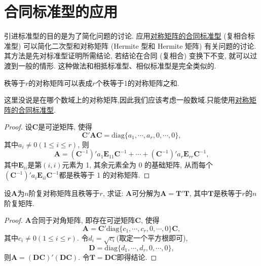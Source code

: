 \documentclass[../../main.tex]{subfiles}%
\begin{document}
\section{合同标准型的应用}

引进标准型的目的是为了简化问题的讨论. 应用\hyperref[theorem:对称矩阵的合同标准型]{对称矩阵的合同标准型} (复相合标准型) 可以简化二次型和对称矩阵 (Hermite 型和 Hermite 矩阵) 有关问题的讨论. 其方法是先对标准型证明所需结论, 若结论在合同 (复相合) 变换下不变, 就可以过渡到一般的情形. 这种做法和相抵标准型、相似标准型是完全类似的.

\begin{proposition}[对称矩阵的秩1分解]\label{proposition:对称矩阵的秩1分解}
秩等于$r$的对称矩阵可以表成$r$个秩等于1的对称矩阵之和.
\end{proposition}
\begin{remark}
这里没说是在哪个数域上的对称矩阵,因此我们应该考虑一般数域.只能使用\hyperref[theorem:对称矩阵的合同标准型]{对称矩阵的合同标准型}.
\end{remark}
\begin{proof}
设$\boldsymbol{C}$是可逆矩阵, 使得
\[
\boldsymbol{C}'\boldsymbol{A}\boldsymbol{C}=\text{diag}\{a_1, \cdots, a_r, 0, \cdots, 0\},
\]
其中$a_i\neq 0 (1\leqslant  i\leqslant  r)$, 则
\[
\boldsymbol{A}=(\boldsymbol{C}^{-1})'a_1\boldsymbol{E}_{11}\boldsymbol{C}^{-1}+\cdots+(\boldsymbol{C}^{-1})'a_r\boldsymbol{E}_{rr}\boldsymbol{C}^{-1},
\]
其中$\boldsymbol{E}_{ii}$是第$(i, i)$元素为 1, 其余元素全为 0 的基础矩阵, 从而每个$(\boldsymbol{C}^{-1})'a_i\boldsymbol{E}_{ii}\boldsymbol{C}^{-1}$都是秩等于 1 的对称矩阵. 
\end{proof}

\begin{proposition}\label{proposition:复对称阵都可分解成相同秩的复矩阵与其转置的乘积}
设$\boldsymbol{A}$为$n$阶复对称矩阵且秩等于$r$, 求证: $\boldsymbol{A}$可分解为$\boldsymbol{A}=\boldsymbol{T}'\boldsymbol{T}$, 其中$\boldsymbol{T}$是秩等于$r$的$n$阶复矩阵.
\end{proposition}
\begin{proof}
$\boldsymbol{A}$合同于对角矩阵, 即存在可逆矩阵$\boldsymbol{C}$, 使得
\[
\boldsymbol{A}=\boldsymbol{C}'\text{diag}\{c_1, \cdots, c_r, 0, \cdots, 0\}\boldsymbol{C},
\]
其中$c_i\neq 0 (1\leqslant  i\leqslant  r)$. 令$d_i = \sqrt{c_i}$(取定一个平方根即可),
\[
\boldsymbol{D}=\text{diag}\{d_1, \cdots, d_r, 0, \cdots, 0\},
\]
则$\boldsymbol{A}=(\boldsymbol{D}\boldsymbol{C})'(\boldsymbol{D}\boldsymbol{C})$. 令$\boldsymbol{T}=\boldsymbol{D}\boldsymbol{C}$即得结论. 
\end{proof}
\end{document}
